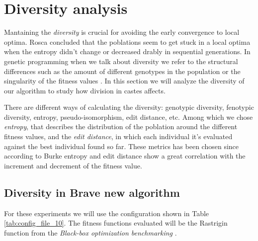 \section{Diversity analysis}


Mantaining the \emph{diversity} is crucial for avoiding the early convergence to local optima. Rosca \cite{Rosca} concluded that 
the poblations seem to get stuck in a local optima when the entropy didn't change or decreased drably in sequential generations.
In genetic programming when we talk about diversity we refer to the structural differences such as the amount of different
genotypes in the population or the singularity of the fitness values \cite{genetic}. In this section we will analyze the diversity of our
algorithm to study how division in castes affects.

There are different ways of calculating the diversity: genotypic diversity, fenotypic diversity, entropy, pseudo-isomorphism, edit distance, etc.
Among which we chose \textit{entropy}, that describes the distribution of the poblation around the different fitness values, and the \textit{edit distance},
in which each individual it's evaluated against the best individual found so far. These metrics has been chosen since according to Burke \cite{Burke} entropy
and edit distance show a great correlation with the increment and decrement of the fitness value.

\subsection{Diversity in Brave new algorithm}

For these experiments we will use the configuration shown in Table \ref{tab:config_file_10}. The fitness functions evaluated will be the Rastrigin
function from the \emph{Black-box optimization benchmarking} \cite{BBOB}.

